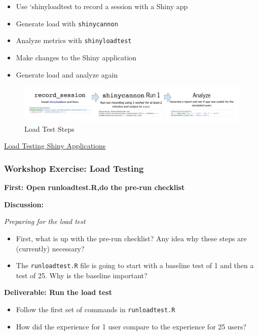 \documentclass[]{book}
\providecommand{\tightlist}{%
  \setlength{\itemsep}{0pt}\setlength{\parskip}{0pt}}
\theoremstyle{definition}
\theoremstyle{definition}
\theoremstyle{definition}
\theoremstyle{remark}
\begin{document}
\begin{itemize}
\tightlist
\item
  Use `shinyloadtest to record a session with a Shiny app
\item
  Generate load with \texttt{shinycannon}
\item
  Analyze metrics with \texttt{shinyloadtest}
\item
  Make changes to the Shiny application
\item
  Generate load and analyze again
\end{itemize}

\begin{figure}
\centering
\includegraphics{imgs/loadtesting/loadtest-steps.png}
\caption{Load Test Steps}
\end{figure}

\href{https://rstudio.github.io/shinyloadtest/index.html}{Load Testing
Shiny Applications}

\hypertarget{workshop-exercise-load-testing}{%
\subsubsection{Workshop Exercise: Load
Testing}\label{workshop-exercise-load-testing}}

\textbf{First: Open runloadtest.R,do the pre-run checklist}

\textbf{Discussion:}

\emph{Preparing for the load test}

\begin{itemize}
\tightlist
\item
  First, what is up with the pre-run checklist? Any idea why these steps
  are (currently) necessary?
\item
  The \texttt{runloadtest.R} file is going to start with a baseline test
  of 1 and then a test of 25. Why is the baseline important?
\end{itemize}

\textbf{Deliverable: Run the load test}

\begin{itemize}
\tightlist
\item
  Follow the first set of commands in \texttt{runloadtest.R}
\item
  How did the experience for 1 user compare to the experience for 25
  users?
\end{itemize}
\end{document}
